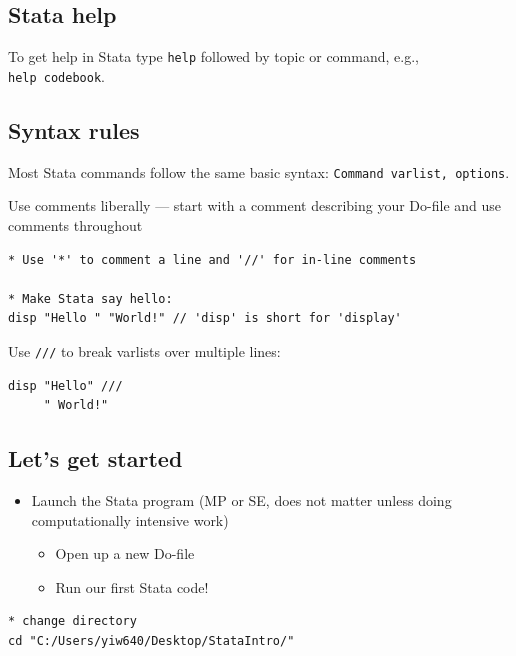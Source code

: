 \documentclass[]{book}
\providecommand{\tightlist}{%
  \setlength{\itemsep}{0pt}\setlength{\parskip}{0pt}}
\begin{document}
\hypertarget{stata-help}{%
\subsection{Stata help}\label{stata-help}}

To get help in Stata type \texttt{help} followed by topic or command, e.g., \texttt{help\ codebook}.

\hypertarget{syntax-rules-2}{%
\subsection{Syntax rules}\label{syntax-rules-2}}

Most Stata commands follow the same basic syntax: \texttt{Command\ varlist,\ options}.

Use comments liberally --- start with a comment describing your Do-file and use comments throughout

\begin{verbatim}
* Use '*' to comment a line and '//' for in-line comments

* Make Stata say hello:
disp "Hello " "World!" // 'disp' is short for 'display'
\end{verbatim}

Use \texttt{///} to break varlists over multiple lines:

\begin{verbatim}
disp "Hello" ///
     " World!"
\end{verbatim}

\hypertarget{lets-get-started}{%
\subsection{Let's get started}\label{lets-get-started}}

\begin{itemize}
\tightlist
\item
  Launch the Stata program (MP or SE, does not matter unless doing computationally intensive work)

  \begin{itemize}
  \tightlist
  \item
    Open up a new Do-file
  \item
    Run our first Stata code!
  \end{itemize}
\end{itemize}

\begin{verbatim}
* change directory
cd "C:/Users/yiw640/Desktop/StataIntro/"
\end{verbatim}
\end{document}
